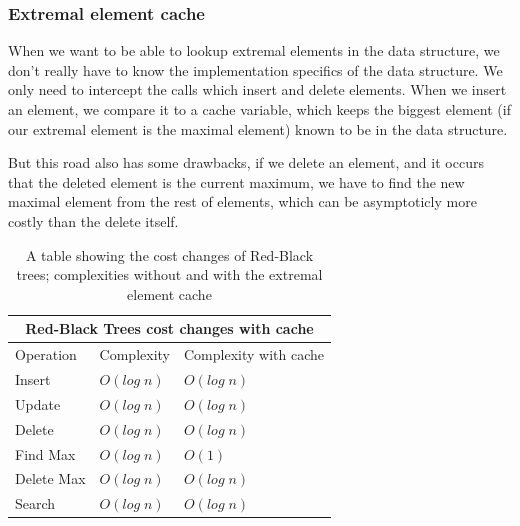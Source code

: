 \documentclass[a4paper,11pt]{article}
\begin{document}
		\subsubsection{Extremal element cache}

			When we want to be able to lookup extremal elements in the data structure, we don't really have
			to know the implementation specifics of the data structure. We only need to intercept the calls
			which insert and delete elements. When we insert an element, we compare it to a cache variable,
			which keeps the biggest element (if our extremal element is the maximal element) known to be in
			the data structure.

			But this road also has some drawbacks, if we delete an element, and it occurs that the deleted
			element is the current maximum, we have to find the new maximal element from the rest of
			elements, which can be asymptoticly more costly than the delete itself.

				\begin{table}[h!]
				\centering
				\begin{tabular}{|l|l|l|}
					\hline
					\multicolumn{3}{|c|}{Red-Black Trees cost changes with cache} \\
					\hline
					Operation & Complexity & Complexity with cache \\
					\hline
					Insert 	        & $O(log \; n)$ & $O(log \; n)$ \\
					Update          & $O(log \; n)$ & $O(log \; n)$ \\
					Delete	        & $O(log \; n)$ & $O(log \; n)$ \\
					Find Max 	& $O(log \; n)$ & {\color{darkgreen}$O(1)$}\\
					Delete Max	& $O(log \; n)$ & $O(log \; n)$ \\
					Search 		& $O(log \; n)$ & $O(log \; n)$ \\
					\hline
				\end{tabular}
				\caption{A table showing the cost changes of Red-Black trees; complexities without and with the
				extremal element cache}
				\label{tab:rbt-cost-change}
			\end{table}
\end{document}
